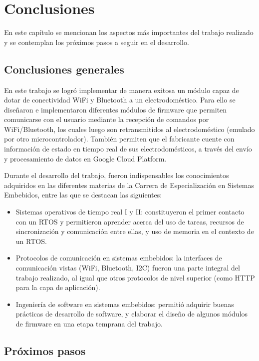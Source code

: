 \chapter{Conclusiones}

En este capítulo se mencionan los aspectos más importantes del trabajo realizado y se contemplan los próximos pasos a seguir en el desarrollo.

\section{Conclusiones generales }

En este trabajo se logró implementar de manera exitosa un módulo capaz de dotar de conectividad WiFi y Bluetooth a un electrodoméstico. Para ello se diseñaron e implementaron diferentes módulos de firmware que permiten comunicarse con el usuario mediante la recepción de comandos por WiFi/Bluetooth, los cuales luego son retransmitidos al electrodoméstico (emulado por otro microcontrolador). También permiten que el fabricante cuente con información de estado en tiempo real de sus electrodomésticos, a través del envío y procesamiento de datos en Google Cloud Platform.

Durante el desarrollo del trabajo, fueron indispensables los conocimientos adquiridos en las diferentes materias de la Carrera de Especialización en Sistemas Embebidos, entre las que se destacan las siguientes:

\begin{itemize}
	\item Sistemas operativos de tiempo real I y II: constituyeron el primer contacto con un RTOS y permitieron aprender acerca del uso de tareas, recursos de sincronización y comunicación entre ellas, y uso de memoria en el contexto de un RTOS. 
	\item Protocolos de comunicación en sistemas embebidos: la interfaces de comunicación vistas (WiFi, Bluetooth, I2C) fueron una parte integral del trabajo realizado, al igual que otros protocolos de nivel superior (como HTTP para la capa de aplicación).
	\item Ingeniería de software en sistemas embebidos: permitió adquirir buenas prácticas de desarrollo de software, y elaborar el diseño de algunos módulos de firmware en una etapa temprana del trabajo.
\end{itemize}

\section{Próximos pasos}

